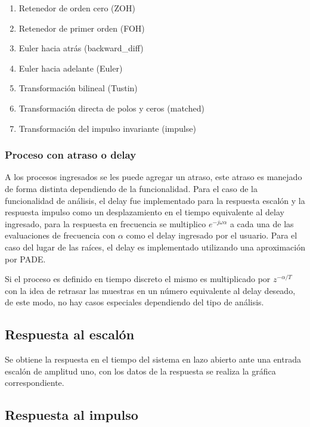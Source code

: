         \begin{enumerate}[leftmargin=\parindent]
            \item Retenedor de orden cero (ZOH)
            \item Retenedor de primer orden (FOH)
            \item Euler hacia atrás (backward\_diff)
            \item Euler hacia adelante (Euler)
            \item Transformación bilineal (Tustin)
            \item Transformación directa de polos y ceros (matched)
            \item Transformación del impulso invariante (impulse)
        \end{enumerate}

    \subsubsection{Proceso con atraso o delay}
        
        A los procesos ingresados se les puede agregar un atraso, este atraso es manejado de forma distinta dependiendo de la funcionalidad. Para el caso de la funcionalidad de análisis, el delay fue implementado para la respuesta escalón y la respuesta impulso como un desplazamiento en el tiempo equivalente al delay ingresado, para la respuesta en frecuencia se multiplico $e^{-j\omega \alpha}$ a cada una de las evaluaciones de frecuencia con $\alpha$ como el delay ingresado por el usuario. Para el caso del lugar de las raíces, el delay es implementado utilizando una aproximación por PADE.

        Si el proceso es definido en tiempo discreto el mismo es multiplicado por $z^{-\alpha/T}$ con la idea de retrasar las muestras en un número equivalente al delay deseado, de este modo, no hay casos especiales dependiendo del tipo de análisis.

    \subsection{Respuesta al escalón}
        
        Se obtiene la respuesta en el tiempo del sistema en lazo abierto ante una entrada escalón de amplitud uno, con los datos de la respuesta se realiza la gráfica correspondiente.
    
    \subsection{Respuesta al impulso}
        

